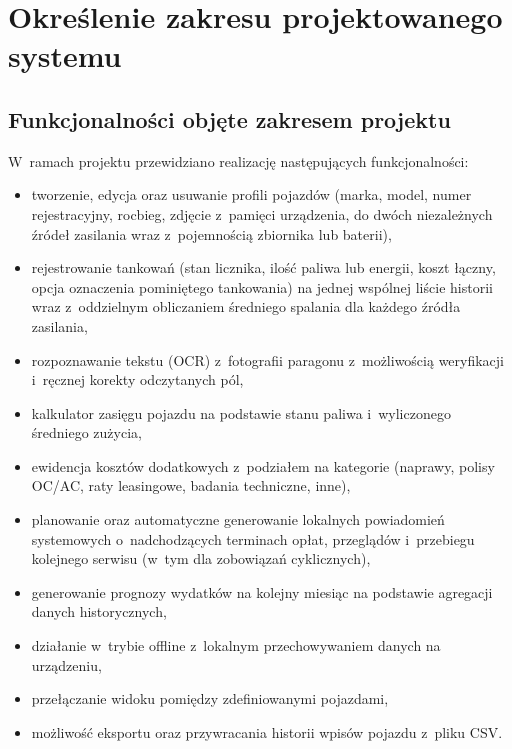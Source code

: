 \section{Określenie zakresu projektowanego systemu}
\label{sec:zakres_systemu}

\subsection{Funkcjonalności objęte zakresem projektu}
\label{subsec:zakres_in}

W~ramach projektu przewidziano realizację następujących funkcjonalności:
\begin{itemize}
    \item tworzenie, edycja oraz usuwanie profili pojazdów (marka, model, numer rejestracyjny, rocbieg, zdjęcie z~pamięci urządzenia, do dwóch niezależnych źródeł zasilania wraz z~pojemnością zbiornika lub baterii),
    \item rejestrowanie tankowań (stan licznika, ilość paliwa lub energii, koszt łączny, opcja oznaczenia pominiętego tankowania) na jednej wspólnej liście historii wraz z~oddzielnym obliczaniem średniego spalania dla każdego źródła zasilania,
    \item rozpoznawanie tekstu (OCR) z~fotografii paragonu z~możliwością weryfikacji i~ręcznej korekty odczytanych pól,
    \item kalkulator zasięgu pojazdu na podstawie stanu paliwa i~wyliczonego średniego zużycia,
    \item ewidencja kosztów dodatkowych z~podziałem na kategorie (naprawy, polisy OC/AC, raty leasingowe, badania techniczne, inne),
    \item planowanie oraz automatyczne generowanie lokalnych powiadomień systemowych o~nadchodzących terminach opłat, przeglądów i~przebiegu kolejnego serwisu (w~tym dla zobowiązań cyklicznych),
    \item generowanie prognozy wydatków na kolejny miesiąc na podstawie agregacji danych historycznych,
    \item działanie w~trybie offline z~lokalnym przechowywaniem danych na urządzeniu,
    \item przełączanie widoku pomiędzy zdefiniowanymi pojazdami,
    \item możliwość eksportu oraz przywracania historii wpisów pojazdu z~pliku CSV.
\end{itemize}


